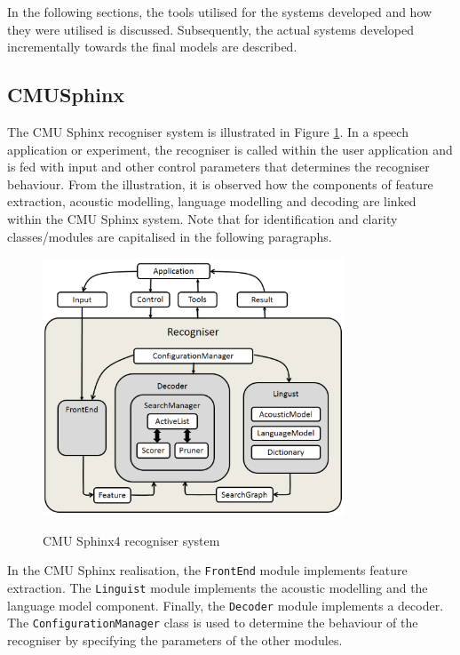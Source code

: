 In the following sections, the tools utilised for the systems developed and how they were utilised is discussed.  Subsequently, the actual systems developed incrementally towards the final models are described.
\subsection{CMUSphinx}
The CMU Sphinx recogniser system is illustrated in Figure \ref{fig_c3_sphinx}.  In a speech application or experiment, the recogniser is called within the user application and is fed with input and other control parameters that determines the recogniser behaviour.  From the illustration, it is observed how the components of feature extraction, acoustic modelling, language modelling and decoding are linked within the CMU Sphinx system.  Note that for identification and clarity classes/modules are capitalised in the following paragraphs.

\begin{figure}
\centering
  \includegraphics[width=9cm]{thesis/images/sphinx}\\
  \caption{CMU Sphinx4 recogniser system }\label{fig_c3_sphinx}
\end{figure}
In the CMU Sphinx realisation, the \texttt{FrontEnd} module implements feature extraction.  The \texttt{Linguist} module implements the acoustic modelling and the language model component. Finally, the \texttt{Decoder} module implements a decoder.  The \texttt{ConfigurationManager} class is used to determine the behaviour of the recogniser by specifying the parameters of the other modules.   

